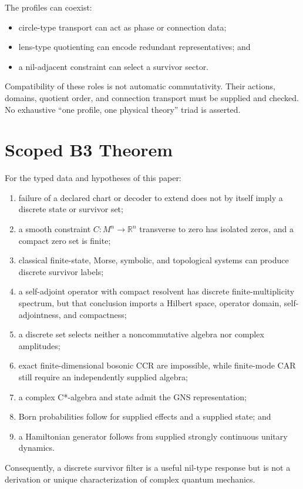 \documentclass[11pt]{article}
\begin{document}
The profiles can coexist:
\begin{itemize}
\item circle-type transport can act as phase or connection data;
\item lens-type quotienting can encode redundant representatives; and
\item a nil-adjacent constraint can select a survivor sector.
\end{itemize}
Compatibility of these roles is not automatic commutativity.  Their actions,
domains, quotient order, and connection transport must be supplied and checked.
No exhaustive ``one profile, one physical theory'' triad is asserted.

\section{Scoped B3 Theorem}

\begin{theorem}
\label{thm:scoped}
For the typed data and hypotheses of this paper:
\begin{enumerate}
\item failure of a declared chart or decoder to extend does not by itself imply
a discrete state or survivor set;
\item a smooth constraint $C:M^n\to\mathbb R^n$ transverse to zero has isolated
zeros, and a compact zero set is finite;
\item classical finite-state, Morse, symbolic, and topological systems can
produce discrete survivor labels;
\item a self-adjoint operator with compact resolvent has discrete
finite-multiplicity spectrum, but that conclusion imports a Hilbert space,
operator domain, self-adjointness, and compactness;
\item a discrete set selects neither a noncommutative algebra nor complex
amplitudes;
\item exact finite-dimensional bosonic CCR are impossible, while finite-mode
CAR still require an independently supplied algebra;
\item a complex C*-algebra and state admit the GNS representation;
\item Born probabilities follow for supplied effects and a supplied state; and
\item a Hamiltonian generator follows from supplied strongly continuous
unitary dynamics.
\end{enumerate}
Consequently, a discrete survivor filter is a useful nil-type response but is
not a derivation or unique characterization of complex quantum mechanics.
\end{theorem}
\end{document}
